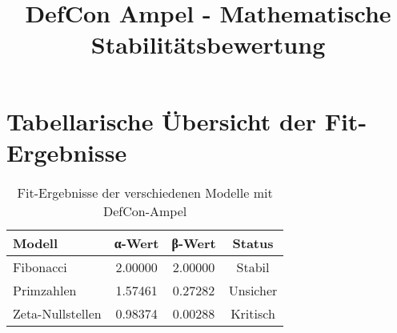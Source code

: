 \documentclass{article}
\begin{document}
\title{DefCon Ampel - Mathematische Stabilitätsbewertung}
\author{}
\date{}
\maketitle

\section*{Tabellarische Übersicht der Fit-Ergebnisse}

\begin{table}[h]
    \centering
    \begin{tabular}{lccc}
        \toprule
        \textbf{Modell} & \textbf{α-Wert} & \textbf{β-Wert} & \textbf{Status} \\
        \midrule
        Fibonacci & 2.00000 & 2.00000 & \cellcolor{green!25} Stabil \\
        Primzahlen & 1.57461 & 0.27282 & \cellcolor{yellow!25} Unsicher \\
        Zeta-Nullstellen & 0.98374 & 0.00288 & \cellcolor{red!25} Kritisch \\
        \bottomrule
    \end{tabular}
    \caption{Fit-Ergebnisse der verschiedenen Modelle mit DefCon-Ampel}
    \label{tab:defcon}
\end{table}
\end{document}
